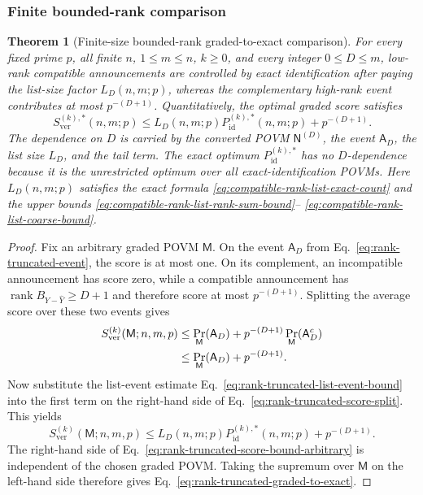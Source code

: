 \documentclass[11pt]{article}
\newcommand{\rank}{\operatorname{rank}}
\newcommand{\1}{\mathbf 1}
\theoremstyle{plain}
\newtheorem{theorem}{Theorem}[section]
\theoremstyle{definition}
\theoremstyle{remark}
\begin{document}
\subsubsection{Finite bounded-rank comparison}
\label{subsubsec:finite-bounded-rank-comparison}

\begin{theorem}[Finite-size bounded-rank graded-to-exact comparison]
\label{thm:rank-truncated-graded-to-exact}
For every fixed prime $p$, all finite $n$, $1\le m\le n$, $k\ge0$, and every
integer $0\le D\le m$, low-rank compatible announcements are controlled
by exact identification after paying the list-size factor $L_D(n,m;p)$,
whereas the complementary high-rank event contributes at most
$p^{-(D+1)}$.  Quantitatively, the optimal graded score satisfies
\begin{equation}
 S_{\mathrm{ver}}^{(k),*}(n,m;p)
 \le
 L_D(n,m;p)P_{\mathrm{id}}^{(k),*}(n,m;p)
 +p^{-(D+1)}.
 \label{eq:rank-truncated-graded-to-exact}
\end{equation}
The dependence on $D$ is carried by the converted POVM $\mathsf N^{(D)}$,
the event $\mathsf A_D$, the list size $L_D$, and the tail term.
The exact optimum $P_{\mathrm{id}}^{(k),*}$ has no $D$-dependence because it is
the unrestricted optimum over all exact-identification POVMs.
Here $L_D(n,m;p)$ satisfies the exact formula
\eqref{eq:compatible-rank-list-exact-count} and the upper bounds
\eqref{eq:compatible-rank-list-rank-sum-bound}--
\eqref{eq:compatible-rank-list-coarse-bound}.
\end{theorem}

\begin{proof}
Fix an arbitrary graded POVM $\mathsf M$.  On the event $\mathsf A_D$ from
Eq.~\eqref{eq:rank-truncated-event}, the score is at most one.  On its
complement, an incompatible announcement has score zero, while a compatible
announcement has $\rank B_{Y-\widehat Y}\ge D+1$ and therefore score at most
$p^{-(D+1)}$.  Splitting the average score over these two events gives
\begin{align}
 S_{\mathrm{ver}}^{(k)}(\mathsf M;n,m,p)
 &\le \Pr_{\mathsf M}(\mathsf A_D)
 +p^{-(D+1)}\Pr_{\mathsf M}(\mathsf A_D^c)\notag\\
 &\le \Pr_{\mathsf M}(\mathsf A_D)+p^{-(D+1)}.
 \label{eq:rank-truncated-score-split}
\end{align}
Now substitute the list-event estimate
Eq.~\eqref{eq:rank-truncated-list-event-bound} into the first term on the
right-hand side of Eq.~\eqref{eq:rank-truncated-score-split}.  This yields
\begin{equation}
 S_{\mathrm{ver}}^{(k)}(\mathsf M;n,m,p)
 \le
 L_D(n,m;p)P_{\mathrm{id}}^{(k),*}(n,m;p)
 +p^{-(D+1)}.
 \label{eq:rank-truncated-score-bound-arbitrary}
\end{equation}
The right-hand side of
Eq.~\eqref{eq:rank-truncated-score-bound-arbitrary} is independent of the
chosen graded POVM.  Taking the supremum over $\mathsf M$ on the left-hand
side therefore gives Eq.~\eqref{eq:rank-truncated-graded-to-exact}.
\end{proof}
\end{document}
